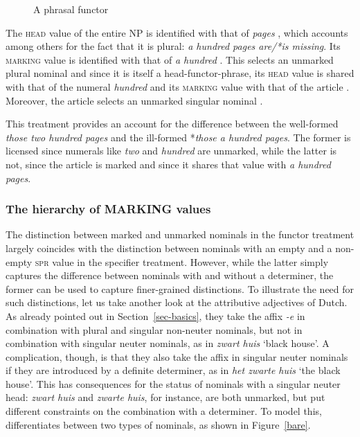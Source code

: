\documentclass[output=paper
	        ,collection
	        ,collectionchapter
 	        ,biblatex
                ,babelshorthands
                ,newtxmath
                ,draftmode
                ,colorlinks, citecolor=brown
]{langscibook}
\begin{document}
\begin{figure}
\centering
{}
\caption{\label{glorie} A phrasal functor}
\end{figure}

The \textsc{head} value of the entire NP is identified with that 
of \emph{pages} , which accounts among others for the fact that it is plural:
\emph{a hundred pages are/*is missing}. 
Its \textsc{marking} value is identified with that of \emph{a hundred} 
. This selects an unmarked plural nominal  and 
since it is itself a head-functor-phrase, its \textsc{head} value is shared with 
that of the numeral \emph{hundred}  and its \textsc{marking} value 
with that of the article . Moreover, the article selects an unmarked 
singular nominal .
 
This treatment provides an account for the difference between 
the well-formed \emph{those two hundred pages} and the 
ill-formed *\emph{those a hundred pages}. The former is licensed since numerals 
like \emph{two} and \emph{hundred} are unmarked, while the latter is not, since 
the article is marked and since it shares that value with \emph{a hundred pages}.  


\subsubsection{The hierarchy of MARKING values} 
\label{sec-without-spec}


The distinction between marked and unmarked nominals in the functor treatment 
largely coincides with the distinction between nominals with an empty and a 
non-empty \textsc{spr} value in the specifier treatment. However, while  
the latter simply captures the difference between nominals with and without 
a determiner, the former can be used to capture finer-grained distinctions.  
To illustrate the need for such distinctions, 
let us take another look at the attributive adjectives of Dutch. 
As already pointed out in Section~\ref{sec-basics}, they take the  
affix \emph{-e} in combination with plural and singular non-neuter nominals, 
but not in combination with singular neuter nominals, as in \emph{zwart huis} 
`black house'.  
A complication, though, is that they also take the affix in singular neuter nominals 
if they are introduced by a definite determiner, as in \emph{het zwarte huis} `the black house'. 
This has consequences for the status of nominals with a singular neuter head: 
\emph{zwart huis} and \emph{zwarte huis}, for instance, are both unmarked, 
but put different constraints on the combination with a determiner. 
To model this, \citet{VanEynde06} differentiates between two types 
of  nominals, as shown in Figure~\ref{bare}. 
\end{document}
